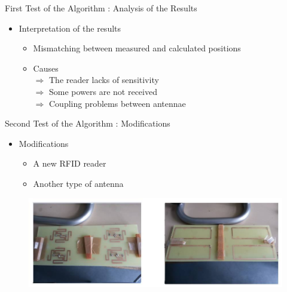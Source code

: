 \documentclass[utf8,compress]{beamer}
\begin{document}
\begin{frame}[containsverbatim]{First Test of the Algorithm : Analysis of the Results}
\begin{block}

 \begin{itemize}
\vspace{6pt}
    \item Interpretation of the results
\vspace{1em} 
 \begin{itemize}
    \item Mismatching between measured and calculated positions
\vspace{6pt}
\vspace{1em} 
     \item Causes \\
\vspace{0.5em} 
	           $\Rightarrow$ The reader lacks of sensitivity \\
		$\Rightarrow$  Some powers are not received \\
		$\Rightarrow$  Coupling problems between antennae \\
    \end{itemize}   
    \end{itemize}   

\end{block}
\end{frame}


\begin{frame}[containsverbatim]{Second Test of the Algorithm : Modifications}
 \begin{itemize}
    \item Modifications 
 \begin{itemize}
    \item A new RFID reader 
     \item Another type of antenna 
    \end{itemize}
    \end{itemize}
    \begin{figure}[h]
        \includegraphics[width=\textwidth]{antennes.jpg}
    \end{figure}
\end{frame}
\end{document}
